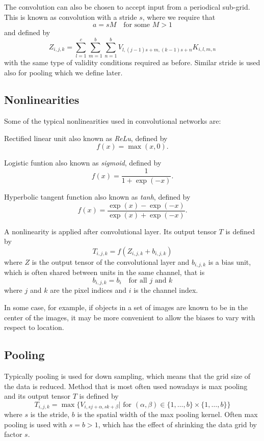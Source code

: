 \documentclass[]{article}
\begin{document}
The convolution can also be chosen to accept input from a periodical sub-grid.
This is known as convolution with a stride $s$, where we require that
\[
a = s M \quad \text{for some $M > 1$}
\]
and defined by
\[
Z_{i, j, k} = \sum_{l=1}^c \sum_{m = 1}^b \sum_{n=1}^b
V_{l, (j -1) s + m, (k-1) s + n} K_{i, l, m, n}
\]
with the same type of validity conditions required as before. Similar stride is used
also for pooling which we define later.

\subsection{Nonlinearities}
Some of the typical nonlinearities used in convolutional networks are:

Rectified linear unit also known as \emph{ReLu}, defined by
\[
f(x) = \max(x, 0).
\]

Logistic funtion also known as \emph{sigmoid}, defined by
\[
f(x) = \frac{1}{1 + \exp(-x)}.
\]

Hyperbolic tangent function also known as \emph{tanh}, defined by
\[
f(x) = \frac{\exp(x) - \exp(-x)}{\exp(x) + \exp(-x)}.
\]

A nonlinearity is applied after convolutional layer. Its output tensor $T$ is defined by
\[
T_{i,j,k} = f(Z_{i, j, k} + b_{i,j,k})
\]
where $Z$ is the output tensor of the convolutional layer and $b_{i, j, k}$ is a
bias unit, which is often shared between units in the same channel, that is
\[
b_{i, j, k} = b_i \quad \text{for all $j$ and $k$}
\]
where $j$ and $k$ are the pixel indices and $i$ is the channel index.

In some case, for example, if objects in a set of images are known to be in the
center of the images, it may be more convenient to allow the biases to vary with
respect to location.

\subsection{Pooling}
Typically pooling is used for down sampling, which means that the grid size of
the data is reduced. Method that is most often used nowadays is max pooling and
its output tensor $T$ is defined by
\[
T_{i, j,k} = \max \{V_{i, s j + \alpha, s k + \beta} |
\text{ for $(\alpha, \beta) \in \{ 1,\ldots, b\} \times  \{ 1,\ldots, b\} $} \}
\]
where $s$ is the stride, $b$ is the spatial width of the max pooling kernel. Often
max pooling is used with $s = b > 1$, which has the effect of shrinking the data
grid by factor $s$.
\end{document}
